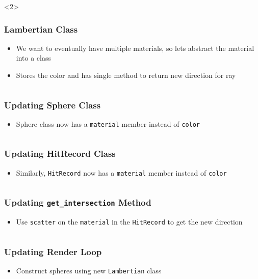 \documentclass{beamer}
\begin{document}
\begin{frame}[fragile]
{\begin{columns}[T]
\begin{column}{0.5\textwidth}
		\end{column}
	\end{columns}
	}<2>
\end{frame}

\begin{frame}[fragile]
	\frametitle{Lambertian Class}
	\begin{itemize}
		\item We want to eventually have multiple materials, so lets abstract the material into a class
		\item Stores the color and has single method to return new direction for ray
	\end{itemize}
	\inputminted{python}{scripts/lambertian.py}
\end{frame}

\begin{frame}[fragile]
	\frametitle{Updating Sphere Class}
	\begin{itemize}
		\item Sphere class now has a \texttt{material} member instead of \texttt{color}
	\end{itemize}
	\inputminted[fontsize=\footnotesize]{python}{scripts/newSphere.py}
\end{frame}

\begin{frame}[fragile]
	\frametitle{Updating HitRecord Class}
	\begin{itemize}
		\item Similarly, \texttt{HitRecord} now has a \texttt{material} member instead of \texttt{color}
	\end{itemize}
	\inputminted{python}{scripts/newRecord.py}
\end{frame}

\begin{frame}[fragile]
	\frametitle{Updating \texttt{get\_intersection} Method}
	\begin{itemize}
		\item Use \texttt{scatter} on the \texttt{material} in the \texttt{HitRecord} to get the new direction
	\end{itemize}
	\inputminted{python}{scripts/newGetIntersection.py}
\end{frame}

\begin{frame}[fragile]
	\frametitle{Updating Render Loop}
	\begin{itemize}
		\item Construct spheres using new \texttt{Lambertian} class
	\end{itemize}
	\inputminted{python}{scripts/newLoop.py}
\end{frame}
\end{document}
